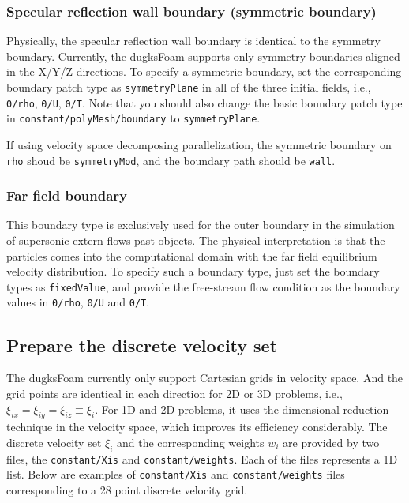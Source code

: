 \subsubsection{Specular reflection wall boundary (symmetric boundary)}
Physically, the specular reflection wall boundary is identical to the symmetry boundary.
Currently, the dugksFoam supports only symmetry boundaries aligned in the X/Y/Z directions.
To specify a symmetric boundary, set the corresponding boundary patch type as \verb|symmetryPlane| in all of the three initial fields, i.e., \verb|0/rho|, \verb|0/U|, \verb|0/T|.
Note that you should also change the basic boundary patch type in \verb|constant/polyMesh/boundary| to \verb|symmetryPlane|.

If using velocity space decomposing parallelization, the symmetric boundary on \verb|rho| shoud be \verb|symmetryMod|, and the boundary path should be  \verb|wall|.

\subsubsection{Far field boundary}
This boundary type is exclusively used for the outer boundary in the simulation of supersonic extern flows past objects.
The physical interpretation is that the particles comes into the computational domain with the far field equilibrium velocity distribution.
To specify such a boundary type, just set the boundary types as \verb|fixedValue|, and provide the free-stream flow condition as the boundary values in
\verb|0/rho|, \verb|0/U| and \verb|0/T|.

\subsection{Prepare the discrete velocity set}
\label{sec_dv}
The dugksFoam currently only support Cartesian grids in velocity space.
And the grid points are identical in each direction for 2D or 3D problems, i.e., $\xi_{ix} = \xi_{iy} = \xi_{iz} \equiv \xi_i$.
For 1D and 2D problems, it uses the dimensional reduction technique in the velocity space, which improves its efficiency considerably.
The discrete velocity set $\xi_i$ and the corresponding weights $w_i$ are provided by two files,
the \verb|constant/Xis| and \verb|constant/weights|. Each of the files represents a 1D list.
Below are examples of \verb|constant/Xis| and \verb|constant/weights| files corresponding to a 28 point discrete velocity grid.

